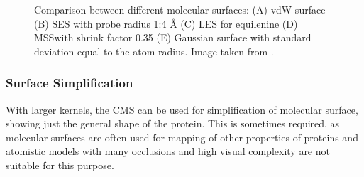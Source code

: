 \begin{figure}[H]
  \centering
  \caption{Comparison between different molecular surfaces: (A) vdW surface (B) SES with probe radius 1:4 Å (C) LES for equilenine (D) MSSwith shrink factor 0.35 (E) Gaussian surface with standard deviation equal to the atom radius. Image taken from \cite{kozlikova2015visualization}.}
  \label{Fig:surface2}  
\end{figure}

\subsubsection{Surface Simplification}
With larger kernels, the CMS can be used for simplification of molecular surface, showing just the general shape of the protein. This is sometimes required, as molecular surfaces are often used for mapping of other properties of proteins and atomistic models with many occlusions and high visual complexity are not suitable for this purpose.

